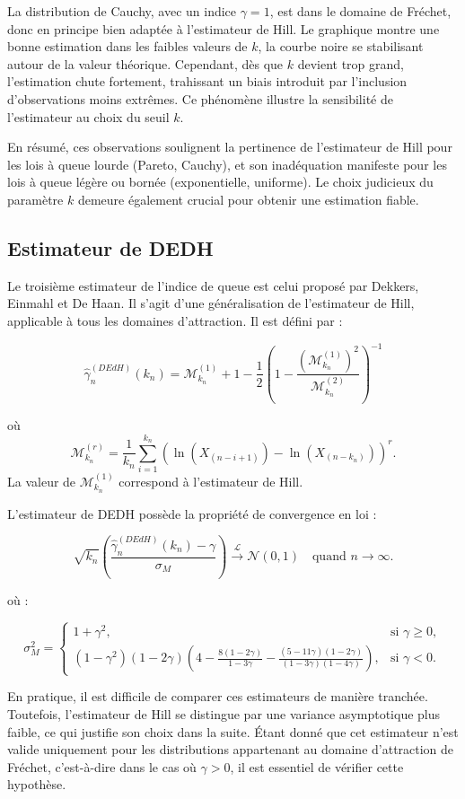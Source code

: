 \documentclass{article}
\begin{document}
La distribution de Cauchy, avec un indice $\gamma = 1$, est dans le domaine de Fréchet, donc en principe bien adaptée à l’estimateur de Hill. Le graphique montre une bonne estimation dans les faibles valeurs de $k$, la courbe noire se stabilisant autour de la valeur théorique. Cependant, dès que $k$ devient trop grand, l’estimation chute fortement, trahissant un biais introduit par l'inclusion d’observations moins extrêmes. Ce phénomène illustre la sensibilité de l’estimateur au choix du seuil $k$.
\medskip

En résumé, ces observations soulignent la pertinence de l’estimateur de Hill pour les lois à queue lourde (Pareto, Cauchy), et son inadéquation manifeste pour les lois à queue légère ou bornée (exponentielle, uniforme). Le choix judicieux du paramètre $k$ demeure également crucial pour obtenir une estimation fiable.

\subsection{Estimateur de DEDH}
Le troisième estimateur de l'indice de queue est celui proposé par Dekkers, Einmahl et De Haan. Il s'agit d'une généralisation de l'estimateur de Hill, applicable à tous les domaines d'attraction. Il est défini par :

\[
\hat{\gamma}_n^{(DEdH)}(k_n) = \mathcal{M}^{(1)}_{k_n} + 1 - \frac{1}{2} \left( 1 - \frac{(\mathcal{M}^{(1)}_{k_n})^2}{\mathcal{M}^{(2)}_{k_n}} \right)^{-1}
\]

où 
\[
\mathcal{M}^{(r)}_{k_n} = \frac{1}{k_n} \sum_{i=1}^{k_n} (\ln(X_{(n-i+1)}) - \ln(X_{(n-k_n)}))^r.
\]
La valeur de \(\mathcal{M}^{(1)}_{k_n}\) correspond à l'estimateur de Hill.

L'estimateur de DEDH possède la propriété de convergence en loi :

\[
\sqrt{k_n}(\frac{\hat{\gamma}_n^{(DEdH)}(k_n) - \gamma}{\sigma_M}) \xrightarrow{\mathcal{L}} \mathcal{N}(0,1) \quad \text{quand } n \to \infty.
\]

où :

\[
\sigma_M^2 = 
\begin{cases} 
1 + \gamma^2, & \text{si } \gamma \geq 0, \\ 
(1 - \gamma^2)(1 - 2\gamma)
\left( 4 - \frac{8 (1 - 2\gamma)}{1 - 3\gamma} - \frac{(5 - 11\gamma)(1 - 2\gamma)}{(1 - 3\gamma)(1 - 4\gamma)} \right), 
& \text{si } \gamma < 0.
\end{cases}
\]

En pratique, il est difficile de comparer ces estimateurs de manière tranchée. Toutefois, l'estimateur de Hill se distingue par une variance asymptotique plus faible, ce qui justifie son choix dans la suite. Étant donné que cet estimateur n'est valide uniquement pour les distributions appartenant au domaine d'attraction de Fréchet, c'est-à-dire dans le cas où \(\gamma > 0\), il est essentiel de vérifier cette hypothèse. 
\end{document}

